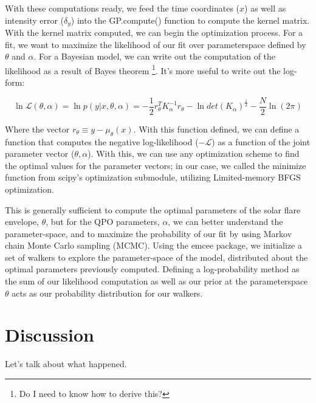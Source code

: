 \documentclass{aastex61}
\begin{document}
With these computations ready, we feed the time coordinates ($x$) as well as intensity error ($\delta_y$) into the GP.compute() function to compute the kernel matrix.
With the kernel matrix computed, we can begin the optimization process. For a fit, we want to maximize the likelihood of our fit over parameterspace defined by $\theta$ and $\alpha$. 
For a Bayesian model, we can write out the computation of the likelihood as a result of Bayes theorem \footnote{Do I need to know how to derive this?}. It's more useful to write out the log-form:

\begin{equation}
	\ln \mathcal{L}(\theta, \alpha) = \ln p(y|x, \theta, \alpha) = -\frac{1}{2}r_\theta^T K_\alpha^{-1}r_\theta - \ln det(K_\alpha)^{\frac{1}{2}} - \frac{N}{2}\ln(2 \pi)
	\label{loglike}
\end{equation}

Where the vector $r_\theta \equiv y-\mu_\theta (x)$. With this function defined, we can define a function that computes the negative log-likelihood ($-\mathcal{L}$) as a function of the joint parameter vector ($\theta, \alpha$).
With this, we can use any optimization scheme to find the optimal values for the parameter vectors; in our case, we called the minimize function from scipy's optimization submodule, utilizing Limited-memory BFGS optimization.

This is generally sufficient to compute the optimal parameters of the solar flare envelope, $\theta$, but for the QPO parameters, $\alpha$, we can better understand the parameter-space, and to maximize the probability of our fit by using Markov chain Monte Carlo sampling (MCMC).
Using the emcee package, we initialize a set of walkers to explore the parameter-space of the model, distributed about the optimal parameters previously computed. Defining a log-probability method as the sum of our likelihood computation as well as our prior at the parameterspace $\theta$ acts as our probability distribution for our walkers.


\section{Discussion} \label{sec:discussion}
Let's talk about what happened.






\end{document}
